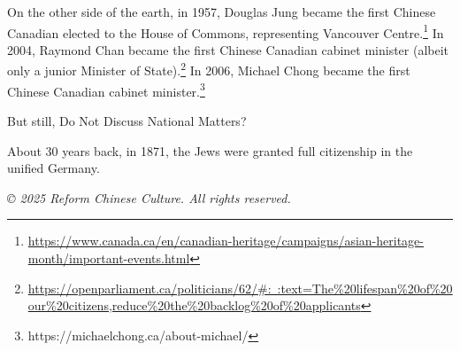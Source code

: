 \documentclass[12pt]{article}
\begin{document}
On the other side of the earth, in 1957, Douglas Jung became the first Chinese Canadian elected to the House of Commons, representing Vancouver Centre.\footnote{\href{https://www.canada.ca/en/canadian-heritage/campaigns/asian-heritage-month/important-events.html}{https://www.canada.ca/en/canadian-heritage/campaigns/asian-heritage-month/important-events.html}} In 2004, Raymond Chan became the first Chinese Canadian cabinet minister (albeit only a junior Minister of State).\footnote{\href{https://openparliament.ca/politicians/62/\#:~:text=The\%20lifespan\%20of\%20our\%20citizens,reduce\%20the\%20backlog\%20of\%20applicants}{https://openparliament.ca/politicians/62/\#:~:text=The\%20lifespan\%20of\%20our\%20citizens,reduce\%20the\%20backlog\%20of\%20applicants}} In 2006, Michael Chong became the first Chinese Canadian cabinet minister.\footnote{https://michaelchong.ca/about-michael/}

But still, Do Not Discuss National Matters?

About 30 years back, in 1871, the Jews were granted full citizenship in the unified Germany.

\vspace{2cm}

\begin{center}
    \textit{© 2025 Reform Chinese Culture. All rights reserved.}
\end{center}
\end{document}
